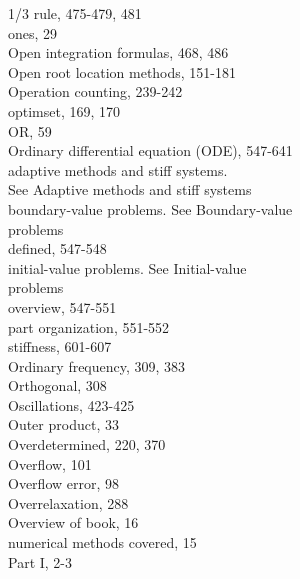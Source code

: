 \documentclass[../main.tex]{subfiles}
\begin{document}
\begin{multicols}{3}
    1/3 rule, 475-479, 481\\
    ones, 29\\
    Open integration formulas, 468, 486\\
    Open root location methods, 151-181\\
    Operation counting, 239-242\\
    optimset, 169, 170\\
    OR, 59\\
    Ordinary differential equation (ODE), 547-641\\
    \hspace*{3mm}adaptive methods and stiff systems.\\
    \hspace*{3mm}See Adaptive methods and stiff systems\\
    \hspace*{3mm}boundary-value problems. See Boundary-value\\
    \hspace*{3mm}problems\\
    \hspace*{3mm}defined, 547-548\\
    \hspace*{3mm}initial-value problems. See Initial-value\\
    \hspace*{3mm}problems\\
    \hspace*{3mm}overview, 547-551\\
    \hspace*{3mm}part organization, 551-552\\
    \hspace*{3mm}stiffness, 601-607\\
    Ordinary frequency, 309, 383\\
    Orthogonal, 308\\
    Oscillations, 423-425\\
    Outer product, 33\\
    Overdetermined, 220, 370\\
    Overflow, 101\\
    Overflow error, 98\\
    Overrelaxation, 288\\
    Overview of book, 16\\
    \hspace*{3mm}numerical methods covered, 15\\
    \hspace*{3mm}Part I, 2-3\\

\end{multicols}
\end{document}
